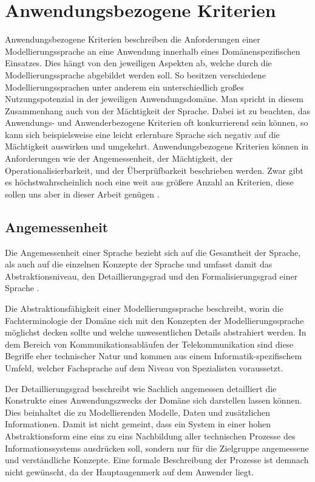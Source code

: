 \section{Anwendungsbezogene Kriterien}
\label{sc:AnwendungsbezogeneKriterien}
Anwendungsbezogene Kriterien beschreiben die Anforderungen einer Modellierungssprache an eine Anwendung innerhalb eines Domänenspezifischen Einsatzes.
Dies hängt von den jeweiligen Aspekten ab, welche durch die Modellierungssprache abgebildet werden soll.
So besitzen verschiedene Modellierungssprachen unter anderem ein unterschiedlich großes Nutzungspotenzial in der jeweiligen Anwendungsdomäne.
Man spricht in diesem Zusammenhang auch von der Mächtigkeit der Sprache.
Dabei ist zu beachten, das Anwendungs- und Anwenderbezogene Kriterien oft konkurrierend sein können,
so kann sich beispielsweise eine leicht erlernbare Sprache sich negativ auf die Mächtigkeit auswirken und umgekehrt.
Anwendungsbezogene Kriterien können in Anforderungen wie der Angemessenheit, der Mächtigkeit, der Operationalisierbarkeit,
und der Überprüfbarkeit beschrieben werden.
Zwar gibt es höchstwahrscheinlich noch eine weit aus größere Anzahl an Kriterien, diese sollen uns aber in dieser Arbeit genügen \cite[95\psq]{JaneFroeming_2009}.
\subsection{Angemessenheit}
\label{ssc:Angemessenheit}
Die Angemessenheit einer Sprache bezieht sich auf die Gesamtheit der Sprache,
als auch auf die einzelnen Konzepte der Sprache und umfasst damit das Abstraktionsniveau, den Detaillierungsgrad und den Formalisierungsgrad einer Sprache \cite[97]{Lobe_2015}.

Die Abstraktionsfähigkeit einer Modellierungssprache beschreibt, worin die Fachterminologie der Domäne sich mit den Konzepten der Modellierungssprache möglichst decken sollte und welche unwesentlichen Details abstrahiert werden. In dem Bereich von Kommunikationsabläufen der Telekommunikation sind diese Begriffe eher technischer Natur und kommen aus einem Informatik-spezifischem Umfeld, welcher Fachsprache auf dem Niveau von Spezialisten voraussetzt. 

Der Detaillierungsgrad beschreibt wie Sachlich angemessen detailliert die Konstrukte eines Anwendungszwecks der Domäne sich darstellen lassen können. Dies beinhaltet die zu Modellierenden Modelle, Daten und zusätzlichen Informationen. Damit ist nicht gemeint, dass ein System in einer hohen Abstraktionsform eine eins zu eins Nachbildung aller technischen Prozesse des Informationssystems ausdrücken soll,
sondern nur für die Zielgruppe angemessene und verständliche Konzepte. Eine formale Beschreibung der Prozesse ist demnach nicht gewünscht, da der Hauptaugenmerk auf dem Anwender liegt.

